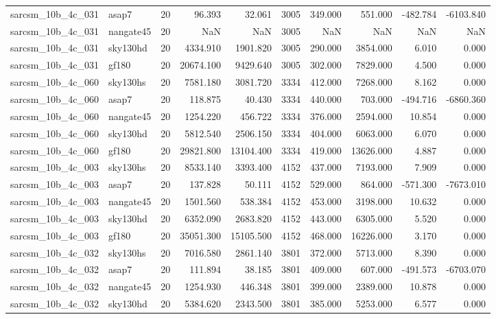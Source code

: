 \begin{tabular}{llrrrrrrrr}
sarcsm\_10b\_4c\_031 & asap7 & 20 & 96.393 & 32.061 & 3005 & 349.000 & 551.000 & -482.784 & -6103.840 \\
sarcsm\_10b\_4c\_031 & nangate45 & 20 & NaN & NaN & 3005 & NaN & NaN & NaN & NaN \\
sarcsm\_10b\_4c\_031 & sky130hd & 20 & 4334.910 & 1901.820 & 3005 & 290.000 & 3854.000 & 6.010 & 0.000 \\
sarcsm\_10b\_4c\_031 & gf180 & 20 & 20674.100 & 9429.640 & 3005 & 302.000 & 7829.000 & 4.500 & 0.000 \\
sarcsm\_10b\_4c\_060 & sky130hs & 20 & 7581.180 & 3081.720 & 3334 & 412.000 & 7268.000 & 8.162 & 0.000 \\
sarcsm\_10b\_4c\_060 & asap7 & 20 & 118.875 & 40.430 & 3334 & 440.000 & 703.000 & -494.716 & -6860.360 \\
sarcsm\_10b\_4c\_060 & nangate45 & 20 & 1254.220 & 456.722 & 3334 & 376.000 & 2594.000 & 10.854 & 0.000 \\
sarcsm\_10b\_4c\_060 & sky130hd & 20 & 5812.540 & 2506.150 & 3334 & 404.000 & 6063.000 & 6.070 & 0.000 \\
sarcsm\_10b\_4c\_060 & gf180 & 20 & 29821.800 & 13104.400 & 3334 & 419.000 & 13626.000 & 4.887 & 0.000 \\
sarcsm\_10b\_4c\_003 & sky130hs & 20 & 8533.140 & 3393.400 & 4152 & 437.000 & 7193.000 & 7.909 & 0.000 \\
sarcsm\_10b\_4c\_003 & asap7 & 20 & 137.828 & 50.111 & 4152 & 529.000 & 864.000 & -571.300 & -7673.010 \\
sarcsm\_10b\_4c\_003 & nangate45 & 20 & 1501.560 & 538.384 & 4152 & 453.000 & 3198.000 & 10.632 & 0.000 \\
sarcsm\_10b\_4c\_003 & sky130hd & 20 & 6352.090 & 2683.820 & 4152 & 443.000 & 6305.000 & 5.520 & 0.000 \\
sarcsm\_10b\_4c\_003 & gf180 & 20 & 35051.300 & 15105.500 & 4152 & 468.000 & 16226.000 & 3.170 & 0.000 \\
sarcsm\_10b\_4c\_032 & sky130hs & 20 & 7016.580 & 2861.140 & 3801 & 372.000 & 5713.000 & 8.390 & 0.000 \\
sarcsm\_10b\_4c\_032 & asap7 & 20 & 111.894 & 38.185 & 3801 & 409.000 & 607.000 & -491.573 & -6703.070 \\
sarcsm\_10b\_4c\_032 & nangate45 & 20 & 1254.930 & 446.348 & 3801 & 399.000 & 2389.000 & 10.878 & 0.000 \\
sarcsm\_10b\_4c\_032 & sky130hd & 20 & 5384.620 & 2343.500 & 3801 & 385.000 & 5253.000 & 6.577 & 0.000 \\

\end{tabular}
